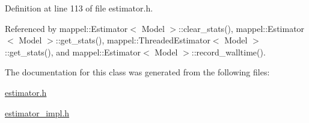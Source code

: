 Definition at line 113 of file estimator.\+h.



Referenced by mappel\+::\+Estimator$<$ Model $>$\+::clear\+\_\+stats(), mappel\+::\+Estimator$<$ Model $>$\+::get\+\_\+stats(), mappel\+::\+Threaded\+Estimator$<$ Model $>$\+::get\+\_\+stats(), and mappel\+::\+Estimator$<$ Model $>$\+::record\+\_\+walltime().



The documentation for this class was generated from the following files\+:\begin{DoxyCompactItemize}
\item 
\hyperlink{estimator_8h}{estimator.\+h}\item 
\hyperlink{estimator__impl_8h}{estimator\+\_\+impl.\+h}\end{DoxyCompactItemize}
